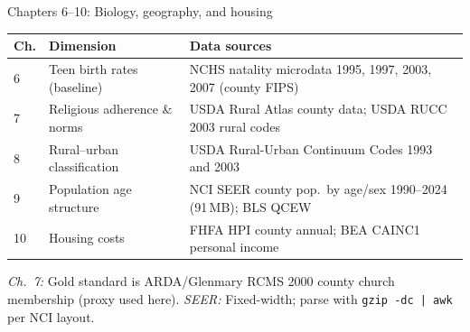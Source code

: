 \documentclass[aspectratio=169,12pt]{beamer}
\begin{document}
\begin{frame}{Chapters 6--10: Biology, geography, and housing}

\vspace{0.2em}
{\scriptsize\setlength{\tabcolsep}{4pt}%
\begin{tabular}{@{}p{}p{}p{}@{}}
\toprule
\textbf{Ch.} & \textbf{Dimension} & \textbf{Data sources} \\
\midrule
6 & Teen birth rates (baseline)
  & NCHS natality microdata 1995, 1997, 2003, 2007 (county FIPS) \\[1pt]
7 & Religious adherence \& norms
  & USDA Rural Atlas county data; USDA RUCC 2003 rural codes \\[1pt]
8 & Rural--urban classification
  & USDA Rural-Urban Continuum Codes 1993 and 2003 \\[1pt]
9 & Population age structure
  & NCI SEER county pop.\ by age/sex 1990--2024 (91\,MB); BLS QCEW \\[1pt]
10 & Housing costs
  & FHFA HPI county annual; BEA CAINC1 personal income \\
\bottomrule
\end{tabular}%
}

\vspace{0.25em}
{\scriptsize\color{OldMortar}
\textit{Ch.\ 7:} Gold standard is ARDA/Glenmary RCMS 2000 county church membership (proxy used here).
\textit{SEER:} Fixed-width; parse with \texttt{gzip -dc | awk} per NCI layout.}

\end{frame}
\end{document}
